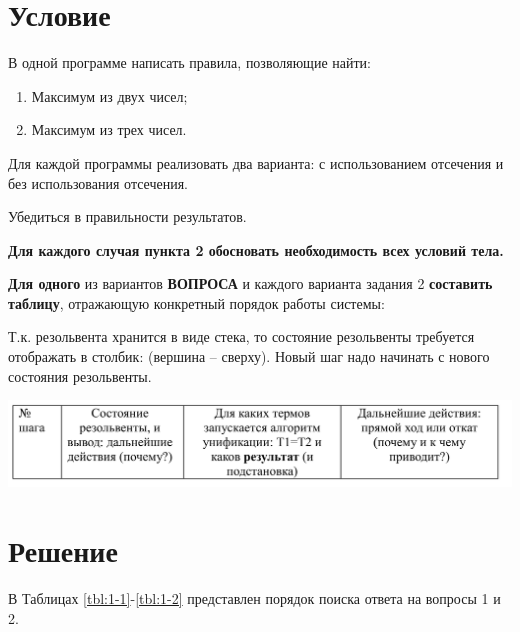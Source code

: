 \section*{Условие}

В одной программе написать правила, позволяющие найти:
\begin{enumerate}
	\item Максимум из двух чисел;
 	\item Максимум из трех чисел.
\end{enumerate}
Для каждой программы реализовать два варианта: с использованием отсечения и без использования отсечения.  

Убедиться в правильности результатов.

\textbf{Для каждого случая пункта 2 обосновать необходимость всех условий тела.}

\textbf{Для одного} из вариантов \textbf{ВОПРОСА} и каждого варианта задания 2 \textbf{составить
таблицу}, отражающую конкретный порядок работы системы:

Т.к. резольвента хранится в виде стека, то состояние резольвенты требуется отображать
в столбик: (вершина – сверху). Новый шаг надо начинать с нового состояния резольвенты.  

\includegraphics[scale=0.4]{./inc/img/tb_tmpl}

\section*{Решение}



В Таблицах \ref{tbl:1-1}-\ref{tbl:1-2} представлен порядок поиска ответа на вопросы 1 и 2.


